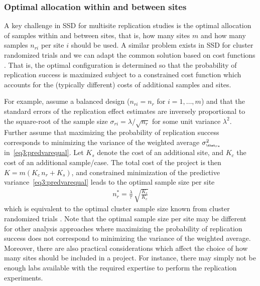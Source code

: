 \subsubsection{Optimal allocation within and between sites}
A key challenge in SSD for multisite replication studies is the optimal
allocation of samples within and between sites, that is, how many sites $m$ and
how many samples $n_{ri}$ per site $i$ should be used. A similar problem exists
in SSD for cluster randomized trials and we can adapt the common solution based
on cost functions \citep{Raudenbush1997}. %
That is, the optimal configuration is determined so that the probability of
replication success is maximized subject to a constrained cost function which
accounts for the (typically different) costs of additional samples and sites.

For example, assume a balanced design ($n_{ri} = n_{r}$ for $i = 1, \dots, m$)
and that the standard errors of the replication effect estimates are inversely
proportional to the square-root of the sample size
$\sigma_{ri} = \lambda/\sqrt{n_{r}}$ for some unit variance $\lambda^{2}$.
Further assume that maximizing the probability of replication success
corresponds to minimizing the variance of the weighted average
$\sigma^{2}_{\scriptscriptstyle \that_{r*}}$ in~\eqref{eq3:predvarequal}. %
Let $K_{s}$ denote the cost of an additional site, and $K_{c}$ the cost of an
additional sample/case. The total cost of the project is then
$K = m(K_{c} \, n_{r} + K_{s})$, and constrained minimization of the predictive
variance~\eqref{eq3:predvarequal} leads to the optimal sample size per site
\begin{align*}
  n_{r}^{*} =  \frac{\lambda}{\tau} \, \sqrt{\frac{K_{s}}{K_{c}}}
\end{align*}
which is equivalent to the optimal cluster sample size known from cluster
randomized trials \citep{Raudenbush2000}. Note that the optimal sample size per
site may be different for other analysis approaches where maximizing the
probability of replication success does not correspond to minimizing the
variance of the weighted average. %
Moreover, there are also practical considerations which affect the choice of how
many sites should be included in a project. For instance, there may simply not
be enough labs available with the required expertise to perform the replication
experiments.

